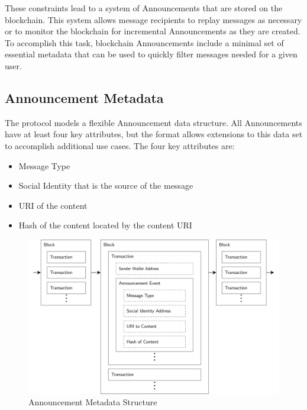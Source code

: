 \documentclass[12pt,letterpaper]{article}
\providecommand{\tightlist}{%
\setlength{\itemsep}{0pt}\setlength{\parskip}{0pt}}
\begin{document}
These constraints lead to a system of Announcements that are stored on the blockchain.
This system allows message recipients to replay messages as necessary or to monitor the
blockchain for incremental Announcements as they are created. To accomplish this task,
blockchain Announcements include a minimal set of essential metadata that can be used to
quickly filter messages needed for a given user.

\subsection{Announcement Metadata}\label{sec:announcement_metadata}

The protocol models a flexible Announcement data structure. All Announcements have at
least four key attributes, but the format allows extensions to this data set to accomplish
additional use cases. The four key attributes are:

\begin{samepage}
	\begin{itemize}
		\tightlist
		\item
		      Message Type
		\item
		      Social Identity that is the source of the message
		\item
		      URI of the content
		\item
		      Hash of the content located by the content URI
	\end{itemize}
\end{samepage}

\begin{figure}
	\includegraphics[width=\linewidth]{figures/Announcement Metadata Structure.png}
	\caption{Announcement Metadata Structure}
	\label{fig:5}
\end{figure}
\end{document}
